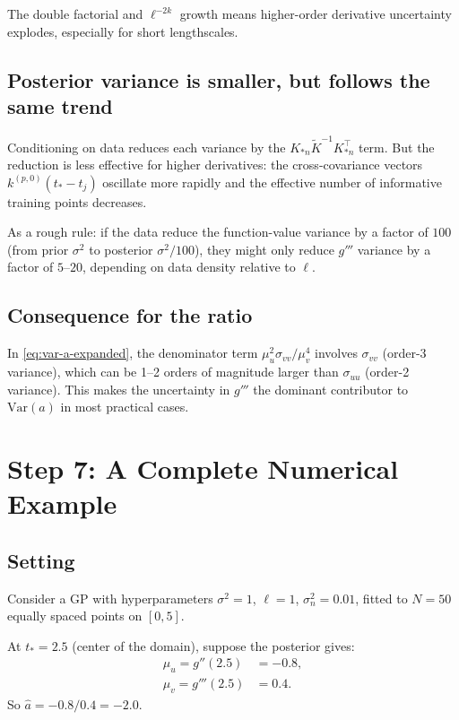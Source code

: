 \documentclass[11pt]{article}
\begin{document}
The double factorial and $\ell^{-2k}$ growth means higher-order derivative uncertainty explodes, especially for short lengthscales.

\subsection{Posterior variance is smaller, but follows the same trend}

Conditioning on data reduces each variance by the $K_{*n}\tilde{K}^{-1}K_{*n}^\top$ term. But the reduction is less effective for higher derivatives: the cross-covariance vectors $k^{(p,0)}(t_*-t_j)$ oscillate more rapidly and the effective number of informative training points decreases.

As a rough rule: if the data reduce the function-value variance by a factor of $100$ (from prior $\sigma^2$ to posterior $\sigma^2/100$), they might only reduce $g'''$ variance by a factor of $5$--$20$, depending on data density relative to $\ell$.

\subsection{Consequence for the ratio}

In \eqref{eq:var-a-expanded}, the denominator term $\mu_u^2\sigma_{vv}/\mu_v^4$ involves $\sigma_{vv}$ (order-3 variance), which can be 1--2 orders of magnitude larger than $\sigma_{uu}$ (order-2 variance). This makes the uncertainty in $g'''$ the dominant contributor to $\mathrm{Var}(a)$ in most practical cases.

\section{Step 7: A Complete Numerical Example}

\subsection{Setting}

Consider a GP with hyperparameters $\sigma^2 = 1$, $\ell = 1$, $\sigma_n^2 = 0.01$, fitted to $N=50$ equally spaced points on $[0, 5]$.

At $t_* = 2.5$ (center of the domain), suppose the posterior gives:
\begin{align*}
\mu_u = g''(2.5) &= -0.8, \\
\mu_v = g'''(2.5) &= 0.4.
\end{align*}
So $\hat{a} = -0.8/0.4 = -2.0$.
\end{document}
